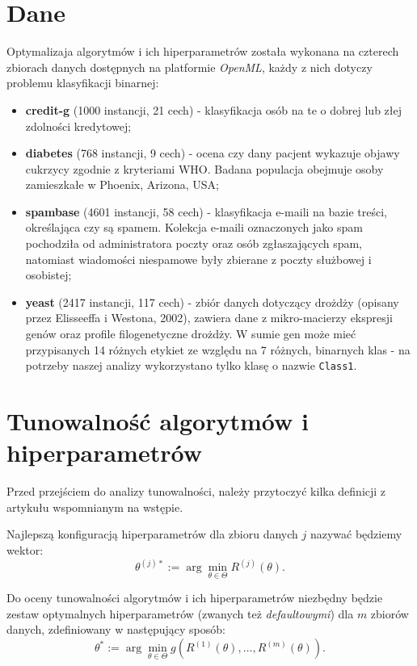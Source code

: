 \documentclass[a4paper,11pt]{article}
\begin{document}
\section{Dane}
\label{sec:data}
Optymalizaja algorytmów i ich hiperparametrów została wykonana na czterech zbiorach danych dostępnych na platformie \textit{OpenML}, każdy z nich dotyczy problemu klasyfikacji binarnej:
\begin{itemize}
    \item \textbf{credit-g} (1000 instancji, 21 cech) - klasyfikacja osób na te o dobrej lub złej zdolności kredytowej;
    \item \textbf{diabetes} (768 instancji, 9 cech) - ocena czy dany pacjent wykazuje objawy cukrzycy zgodnie z kryteriami WHO. Badana populacja obejmuje osoby zamieszkałe w Phoenix, Arizona, USA;
    \item \textbf{spambase} (4601 instancji, 58 cech) - klasyfikacja e-maili na bazie treści, określająca czy są spamem. Kolekcja e-maili oznaczonych jako spam pochodziła od administratora poczty oraz osób zgłaszających spam, natomiast wiadomości niespamowe były zbierane z poczty służbowej i osobistej;
    \item \textbf{yeast} (2417 instancji, 117 cech) - zbiór danych dotyczący drożdży (opisany przez Elisseeffa i Westona, 2002), zawiera dane z mikro-macierzy ekspresji genów oraz profile filogenetyczne drożdży. W sumie gen może mieć przypisanych 14 różnych etykiet ze względu na 7 różnych, binarnych klas - na potrzeby naszej analizy wykorzystano tylko klasę o nazwie \texttt{Class1}.
\end{itemize}

\section{Tunowalność algorytmów i hiperparametrów}
Przed przejściem do analizy tunowalności, należy przytoczyć kilka definicji z artykułu\cite{tuna} wspomnianym na wstępie.

Najlepszą konfiguracją hiperparametrów dla zbioru danych $j$ nazywać będziemy wektor:
\begin{equation}
    \label{best_params}
    \theta^{(j)*} := \arg \min_{\theta \in \Theta} R^{(j)}(\theta).
\end{equation}

Do oceny tunowalności algorytmów i ich hiperparametrów niezbędny będzie zestaw optymalnych hiperparametrów (zwanych też \textit{defaultowymi}) dla $m$ zbiorów danych, zdefiniowany w następujący sposób:
\begin{equation}
    \label{default_params}
    \theta^* := \arg \min_{\theta \in \Theta} g\left(R^{(1)}(\theta), \ldots, R^{(m)}(\theta)\right).
\end{equation}
\end{document}

